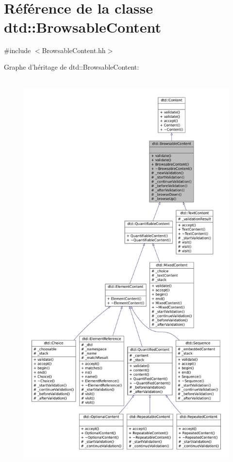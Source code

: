 \hypertarget{classdtd_1_1_browsable_content}{
\section{Référence de la classe dtd::BrowsableContent}
\label{classdtd_1_1_browsable_content}
}


{\ttfamily \#include $<$BrowsableContent.hh$>$}



Graphe d'héritage de dtd::BrowsableContent:\nopagebreak
\begin{figure}[H]
\begin{center}
\leavevmode
\includegraphics[height=600pt]{classdtd_1_1_browsable_content__inherit__graph}
\end{center}
\end{figure}


